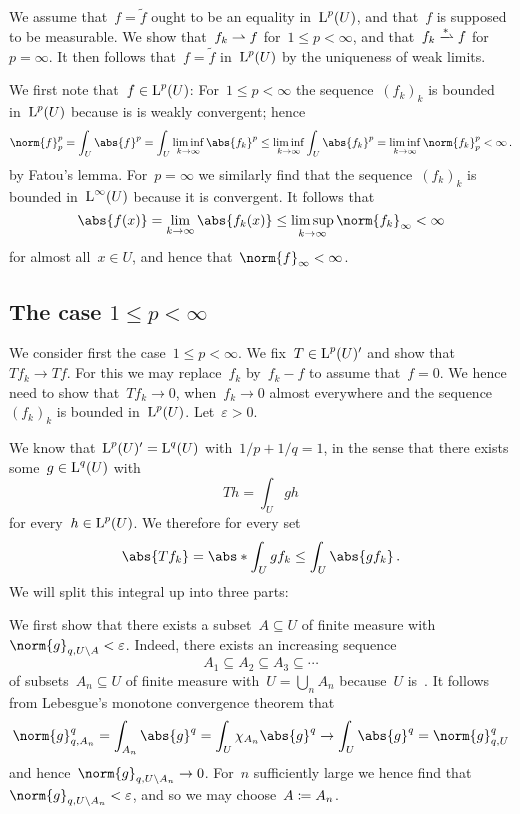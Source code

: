 \section{}

We assume that~$f = \tilde{f}$ ought to be an equality in~$\operatorname{L}^p(U)$, and that~$f$ is supposed to be measurable.
We show that~$f_k \rightharpoonup f$ for~$1 \leq p < \infty$, and that~$f_k \wtostar f$ for~$p = \infty$.
It then follows that~$f = \tilde{f}$ in~$\operatorname{L}^p(U)$ by the uniqueness of weak limits.

We first note that~$f \in \operatorname{L}^p(U)$:
For~$1 \leq p < \infty$ the sequence~$(f_k)_k$ is bounded in~$\operatorname{L}^p(U)$ because is is weakly convergent;
hence
\[
  \norm{f}_p^p
  =
  \int_U \abs{f}^p
  =
  \int_U \liminf_{k \to \infty} \abs{f_k}^p
  \leq
  \liminf_{k \to \infty} \int_U \abs{f_k}^p
  =
  \liminf_{k \to \infty} \norm{f_k}_p^p
  <
  \infty \,.
\]
by Fatou’s lemma.
For~$p = \infty$ we similarly find that the sequence~$(f_k)_k$ is bounded in~$\operatorname{L}^\infty(U)$ because it is {\weaklystar} convergent.
It follows that
\[
  \abs{f(x)}
  =
  \lim_{k \to \infty} \abs{f_k(x)}
  \leq
  \limsup_{k \to \infty} \norm{f_k}_\infty
  <
  \infty
\]
for almost all~$x \in U$, and hence that~$\norm{f}_\infty < \infty$.





\subsection*{The case $1 \leq p < \infty$}

We consider first the case~$1 \leq p < \infty$.
We fix~$T \in \operatorname{L}^p(U)'$ and show that~$T f_k \to T f$.
For this we may replace~$f_k$ by~$f_k - f$ to assume that~$f = 0$.
We hence need to show that~$T f_k \to 0$, when~$f_k \to 0$ almost everywhere and the sequence~$(f_k)_k$ is bounded in~$\operatorname{L}^p(U)$.
Let~$\varepsilon > 0$.

We know that~$\operatorname{L}^p(U)' = \operatorname{L}^q(U)$ with~$1/p + 1/q = 1$, in the sense that there exists some~$g \in \operatorname{L}^q(U)$ with
\[
    T h
  = \int_U g h
\]
for every~$h \in \operatorname{L}^p(U)$.
We therefore for every set
\[
  \abs{ T f_k }
  =
  \abs*{ \int_U g f_k }
  \leq
  \int_U \abs{g f_k} \,.
\]
We will split this integral up into three parts:

We first show that there exists a subset~$A \subseteq U$ of finite measure with~$\norm{g}_{q,U \setminus A} < \varepsilon$.
Indeed, there exists an increasing sequence
\[
  A_1
  \subseteq
  A_2
  \subseteq
  A_3
  \subseteq
  \dotsb
\]
of subsets~$A_n \subseteq U$ of finite measure with~$U = \bigcup_n A_n$ because~$U$ is~.
It follows from Lebesgue’s monotone convergence theorem that
\[
  \norm{g}_{q,A_n}^q
  =
  \int_{A_n} \abs{g}^q
  =
  \int_U \chi_{A_n} \abs{g}^q
  \to
  \int_U \abs{g}^q
  =
  \norm{g}_{q,U}^q
\]
and hence~$\norm{g}_{q, U \setminus A_n} \to 0$.
For~$n$ sufficiently large we hence find that~$\norm{g}_{q, U \setminus A_n} < \varepsilon$, and so we may choose~$A \coloneqq A_n$.

